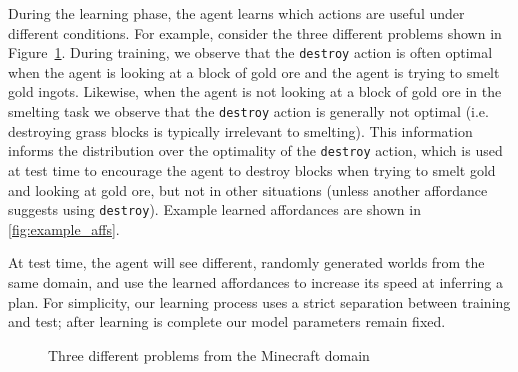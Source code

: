 \documentclass[letterpaper]{article}
\begin{document}
During the learning phase, the agent learns which actions are useful
under different conditions.  For example, consider the three different
problems shown in Figure~\ref{fig:minecraft}.  During training, we observe
that the \texttt{destroy} action is often optimal when the agent is
looking at a block of gold ore and the agent is trying to smelt gold
ingots.  Likewise, when the agent is not looking at a block of gold
ore in the smelting task we observe that the \texttt{destroy} action
is generally not optimal (i.e. destroying grass blocks is typically
irrelevant to smelting).  This information informs the distribution
over the optimality of the \texttt{destroy} action, which is used at
test time to encourage the agent to destroy blocks when trying to
smelt gold and looking at gold ore, but not in other situations
(unless another affordance suggests using \texttt{destroy}). Example
learned affordances are shown in \ref{fig:example_affs}.

At test time, the agent will see different, randomly generated worlds
from the same domain, and use the learned affordances to increase its
speed at inferring a plan.  For simplicity, our learning process uses
a strict separation between training and test; after learning is
complete our model parameters remain fixed. 


\begin{figure}
\centering
{}
  \caption{Three different problems from the Minecraft domain}
  \label{fig:minecraft}
\end{figure}
\end{document}

